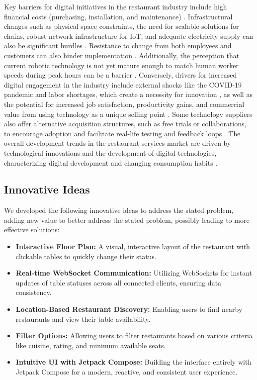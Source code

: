 \documentclass{article}
\begin{document}
Key barriers for digital initiatives in the restaurant industry include high financial costs (purchasing, installation, and maintenance) \parencite{buurman2024investigating}. Infrastructural changes such as physical space constraints, the need for scalable solutions for chains, robust network infrastructure for IoT, and adequate electricity supply can also be significant hurdles \parencite{buurman2024investigating}. Resistance to change from both employees and customers can also hinder implementation \parencite{buurman2024investigating}. Additionally, the perception that current robotic technology is not yet mature enough to match human worker speeds during peak hours can be a barrier \parencite{buurman2024investigating}. Conversely, drivers for increased digital engagement in the industry include external shocks like the COVID-19 pandemic and labor shortages, which create a necessity for innovation \parencite{buurman2024investigating}, as well as the potential for increased job satisfaction, productivity gains, and commercial value from using technology as a unique selling point \parencite{buurman2024investigating}. Some technology suppliers also offer alternative acquisition structures, such as free trials or collaborations, to encourage adoption and facilitate real-life testing and feedback loops \parencite{buurman2024investigating}. The overall development trends in the restaurant services market are driven by technological innovations and the development of digital technologies, characterizing digital development and changing consumption habits \parencite{yudina2024trends}.

\subsection{Innovative Ideas}
We developed the following innovative ideas to address the stated problem, adding new value to better address the stated problem, possibly leading to more effective solutions:
\begin{itemize}
    \item \textbf{Interactive Floor Plan:} A visual, interactive layout of the restaurant with clickable tables to quickly change their status.
    \item \textbf{Real-time WebSocket Communication:} Utilizing WebSockets for instant updates of table statuses across all connected clients, ensuring data consistency.
    \item \textbf{Location-Based Restaurant Discovery:} Enabling users to find nearby restaurants and view their table availability.
    \item \textbf{Filter Options:} Allowing users to filter restaurants based on various criteria like cuisine, rating, and minimum available seats.
    \item \textbf{Intuitive UI with Jetpack Compose:} Building the interface entirely with Jetpack Compose for a modern, reactive, and consistent user experience.
\end{itemize}
\end{document}
